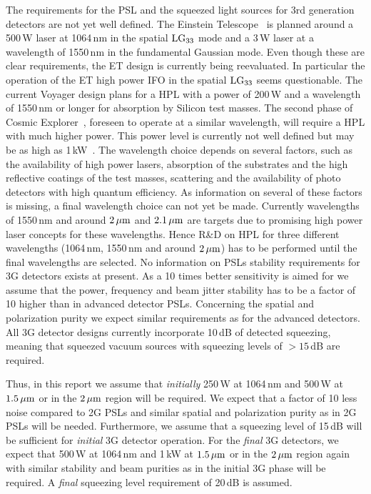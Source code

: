 The requirements for the PSL and the squeezed light sources for 3rd generation detectors are not yet well defined. The Einstein Telescope~\cite{ET2011} is planned around a 500\,W laser at 1064\,nm in the spatial $\rm LG_{33}$ mode and a 3\,W laser at a wavelength of 1550\,nm in the fundamental Gaussian mode.
Even though these are clear requirements, the ET design is currently being reevaluated. In particular the operation of the ET high power IFO in the spatial $\rm LG_{33}$ seems questionable. The current Voyager design plans for a HPL with a power of 200\,W and a wavelength of 1550\,nm or longer for absorption by Silicon test masses. The second phase of Cosmic Explorer~\cite{CosmicExplorer2017}, foreseen to operate at a similar wavelength, will require a HPL with much higher power. This power level is currently not well defined but may be as high as 1\,kW~\cite{GWADW2018,ISWP:2018}. The wavelength choice depends on several factors, such as the availability of high power lasers, absorption of the substrates and the high reflective coatings of the test masses, scattering and the availability of photo detectors with high quantum efficiency. As information on several of these factors is missing, a final wavelength choice can not yet be made. Currently wavelengths of 1550\,nm and around $\rm 2\, \mu m $ and $\rm 2.1\, \mu m $ are targets due to promising high power laser concepts for these wavelengths. Hence R\&D on HPL for three different wavelengths (1064\,nm, 1550\,nm and around $\rm 2\, \mu m $) has to be performed until the final wavelengths are selected. 
No information on PSLs stability requirements for 3G detectors exists at present. As a 10 times better sensitivity is aimed for we assume that the power, frequency and beam jitter stability has to be a factor of 10 higher than in advanced detector PSLs. Concerning the spatial and polarization purity we expect similar requirements as for the advanced detectors.
All 3G detector designs currently incorporate 10\,dB of detected squeezing, meaning that squeezed vacuum sources with squeezing levels of $> 15$\,dB are required.

Thus, in this report we assume that \emph{initially} 250\,W at 1064\,nm and 500\,W at  $ 1.5\, {\rm \mu m}$ or in the $ 2\, {\rm \mu m}$ region will be required. We expect that a factor of 10 less noise compared to 2G PSLs and similar spatial and polarization purity as in 2G PSLs will be needed. Furthermore, we assume that a squeezing level of 15\,dB will be sufficient for \emph{initial} 3G detector operation. For the \emph{final} 3G detectors, we expect that  500\,W at 1064\,nm and 1\,kW at  $ 1.5\, {\rm \mu m}$ or in the $ 2\, {\rm \mu m}$ region again with similar stability and beam purities as in the initial 3G phase will be required. A \emph{final} squeezing level requirement of 20\,dB is assumed.

